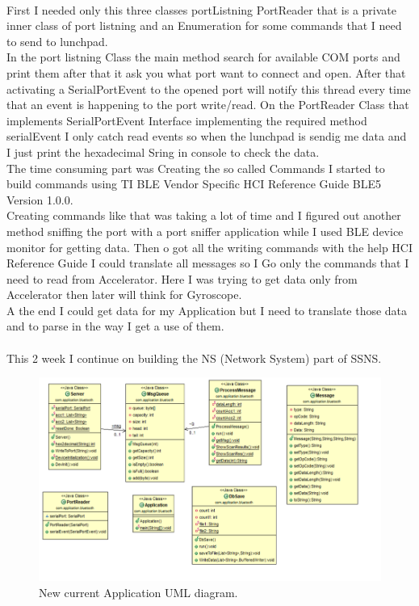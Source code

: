 \documentclass[12pt]{article}
\begin{document}
\\First I needed only this three classes portListning PortReader that is a private inner class of port listning and an Enumeration for some commands that I need to send to lunchpad.\\
In the port listning Class the main method search for available COM ports and print them after that it ask you what port want to connect and open. After that activating a SerialPortEvent to the opened port will notify this thread every time that an event is happening to the port write/read.
On the PortReader Class that implements SerialPortEvent Interface implementing the required method serialEvent I only catch read events so when the lunchpad is sendig me data and I just print the hexadecimal Sring in console to check the data.\\
The time consuming part was Creating the so called Commands I started to build commands using TI BLE Vendor Specific HCI Reference Guide BLE5 Version 1.0.0.\\
Creating commands like that was taking a lot of time and I figured out another method sniffing the port with a port sniffer application while I used BLE device monitor for getting data.
Then o got all the writing commands with the help HCI Reference Guide I could translate all messages so I Go only the commands that I need to read from Accelerator. Here I was trying to get data only from Accelerator then later will think for Gyroscope.\\
A the end I could get data for my Application but I need to translate those data and to parse in the way I get a use of them.\\\\
This 2 week I continue on building the NS (Network System) part of SSNS.\\
\begin{figure}[h]
	\centering
	\includegraphics[scale=0.50]{images/UML2.png}
	\caption{New current Application UML diagram.}
	\label{img:UML2}
\end{figure}
\end{document}
